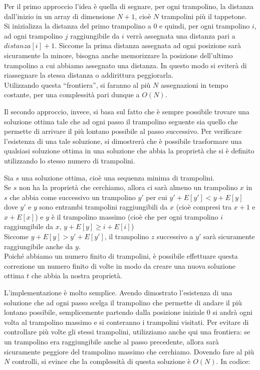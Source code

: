 Per il primo approccio l'idea è quella di segnare, per ogni trampolino, la distanza dall'inizio in un array di dimensione $N+1$, cioè $N$ trampolini più il tappetone.\\Si inizializza la distanza del primo trampolino a $0$ e quindi, per ogni trampolino $i$, ad ogni trampolino $j$ raggiungibile da $i$ verrà assegnata una distanza pari a $distanza[i] + 1$. Siccome la prima distanza assegnata ad ogni posizione sarà sicuramente la minore, bisogna anche memorizzare la posizione dell'ultimo trampolino a cui abbiamo assegnato una distanza. In questo modo si eviterà di riassegnare la stessa distanza o addirittura peggiorarla.\\Utilizzando questa ``frontiera'', si faranno al più $N$ assegnazioni in tempo costante, per una complessità pari dunque a $O(N)$.

Il secondo approccio, invece, si basa sul fatto che è sempre possibile trovare una soluzione ottima tale che ad ogni passo il trampolino seguente sia quello che permette di arrivare il più lontano possibile al passo successivo.
Per verificare l'esistenza di una tale soluzione, si dimostrerà che è possibile trasformare una qualsiasi soluzione ottima in una soluzione che abbia la proprietà che si è definito utilizzando lo stesso numero di trampolini.

Sia $s$ una soluzione ottima, cioè una sequenza minima di trampolini.\\
Se $s$ non ha la proprietà che cerchiamo, allora ci sarà almeno un trampolino $x$ in $s$ che abbia come successivo un trampolino $y'$ per cui $y' + E[y'] < y + E[y]$ dove $y'$ e $y$ sono entrambi trampolini raggiungibili da $x$ (cioè compresi tra $x + 1$ e $x + E[x]$) e $y$ è il trampolino massimo (cioè che per ogni trampolino $i$ raggiungibile da $x$, $y + E[y] \geq i + E[i]$)\\
Siccome $y + E[y] > y' + E[y']$, il trampolino $z$ successivo a $y'$ sarà  sicuramente raggiungibile anche da $y$.\\Poiché abbiamo un numero finito di trampolini, è possibile effettuare questa correzione un numero finito di volte in modo da creare una nuova soluzione ottima $t$ che abbia la nostra proprietà.

L'implementazione è molto semplice. Avendo dimostrato l'esistenza di una soluzione che ad ogni passo scelga il trampolino che permette di andare il più lontano possibile, semplicemente partendo dalla posizione iniziale $0$ si andrà ogni volta al trampolino massimo e si conteranno i trampolini visitati. Per evitare di controllare più volte gli stessi trampolini, utilizziamo anche qui una frontiera: se un trampolino era raggiungibile anche al passo precedente, allora sarà sicuramente peggiore del trampolino massimo che cerchiamo. Dovendo fare al più $N$ controlli, si evince che la complessità di questa soluzione è $O(N)$. In codice:

\colorbox{white}{}